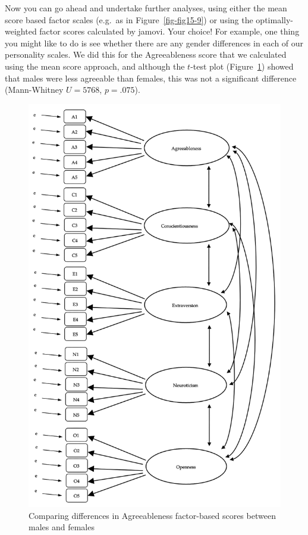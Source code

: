 \documentclass[
  a4paper,
]{book}
\begin{document}
Now you can go ahead and undertake further analyses, using either the
mean score based factor scales (e.g.~as in Figure~\ref{fig-fig15-9}) or
using the optimally-weighted factor scores calculated by jamovi. Your
choice! For example, one thing you might like to do is see whether there
are any gender differences in each of our personality scales. We did
this for the Agreeableness score that we calculated using the mean score
approach, and although the \(t\)-test plot (Figure~\ref{fig-fig15-12})
showed that males were less agreeable than females, this was not a
significant difference (Mann-Whitney \(U = 5768\), \(p = .075\)).

\begin{figure}

\includegraphics[width=1\textwidth,height=\textheight]{images/fig15-12.png} \hfill{}

\caption{\label{fig-fig15-12}Comparing differences in Agreeableness
factor-based scores between males and females}

\end{figure}
\end{document}
